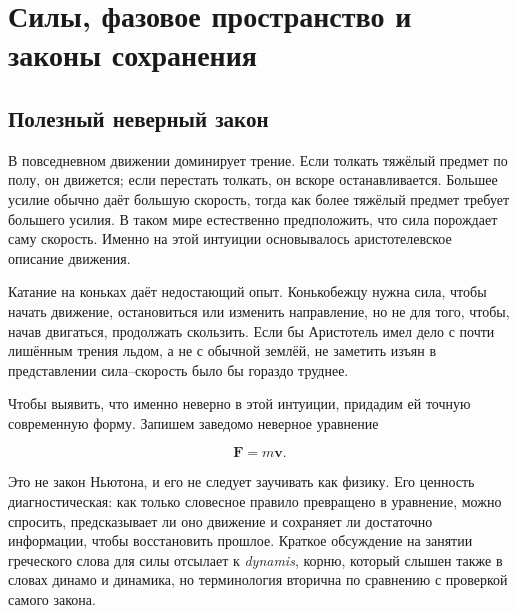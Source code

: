 \chapter{Силы, фазовое пространство и законы сохранения}


\section{Полезный неверный закон}

В повседневном движении доминирует трение. Если толкать тяжёлый предмет по полу, он движется; если перестать толкать, он вскоре останавливается. Большее усилие обычно даёт большую скорость, тогда как более тяжёлый предмет требует большего усилия. В таком мире естественно предположить, что сила порождает саму скорость. Именно на этой интуиции основывалось аристотелевское описание движения.

Катание на коньках даёт недостающий опыт. Конькобежцу нужна сила, чтобы начать движение, остановиться или изменить направление, но не для того, чтобы, начав двигаться, продолжать скользить. Если бы Аристотель имел дело с почти лишённым трения льдом, а не с обычной землёй, не заметить изъян в представлении сила--скорость было бы гораздо труднее.

Чтобы выявить, что именно неверно в этой интуиции, придадим ей точную современную форму. Запишем заведомо неверное уравнение

\begin{equation}
  \mathbf F=m\mathbf v.
  \label{eq:aristotle-vector-law}
\end{equation}

Это не закон Ньютона, и его не следует заучивать как физику. Его ценность диагностическая: как только словесное правило превращено в уравнение, можно спросить, предсказывает ли оно движение и сохраняет ли достаточно информации, чтобы восстановить прошлое. Краткое обсуждение на занятии греческого слова для силы отсылает к \emph{dynamis}, корню, который слышен также в словах динамо и динамика, но терминология вторична по сравнению с проверкой самого закона.

